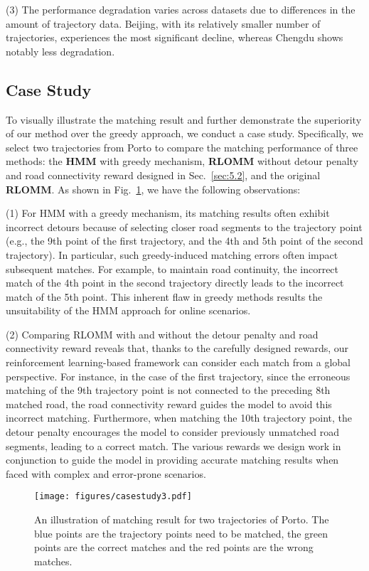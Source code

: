 \noindent (3) The performance degradation varies across datasets due to differences in the amount of trajectory data. Beijing, with its relatively smaller number of trajectories, experiences the most significant decline, whereas Chengdu shows notably less degradation.

\subsection{Case Study}
To visually illustrate the matching result and further demonstrate the superiority of our method over the greedy approach, we conduct a case study. Specifically, we select two trajectories from Porto to compare the matching performance of three methods: the \textbf{HMM} with greedy mechanism, \textbf{RLOMM} without detour penalty and road connectivity reward designed in Sec.~\ref{sec:5.2}, and the original \textbf{RLOMM}. As shown in Fig.~\ref{fig:case}, we have the following observations:

\noindent (1) For HMM with a greedy mechanism, its matching results often exhibit incorrect detours because of selecting closer road segments to the trajectory point (e.g., the 9th point of the first trajectory, and the 4th and 5th point of the second trajectory). In particular, such greedy-induced matching errors often impact subsequent matches. For example, to maintain road continuity, the incorrect match of the 4th point in the second trajectory directly leads to the incorrect match of the 5th point. This inherent flaw in greedy methods results the unsuitability of the HMM approach for online scenarios.

\noindent (2) Comparing RLOMM with and without the detour penalty and road connectivity reward reveals that, thanks to the carefully designed rewards, our reinforcement learning-based framework can consider each match from a global perspective. For instance, in the case of the first trajectory, since the erroneous matching of the 9th trajectory point is not connected to the preceding 8th matched road, the road connectivity reward guides the model to avoid this incorrect matching. Furthermore, when matching the 10th trajectory point, the detour penalty encourages the model to consider previously unmatched road segments, leading to a correct match. The various rewards we design work in conjunction to guide the model in providing accurate matching results when faced with complex and error-prone scenarios.


\begin{figure}
  \centering  
  \texttt{[image: figures/casestudy3.pdf]}
  \vspace{-0.15in}
  \caption{An illustration of matching result for two trajectories of Porto. The blue points are the trajectory points need to be matched, the green points are the correct matches and the red points are the wrong matches.}
  \vspace{-0.15in}
  \label{fig:case}
\end{figure}